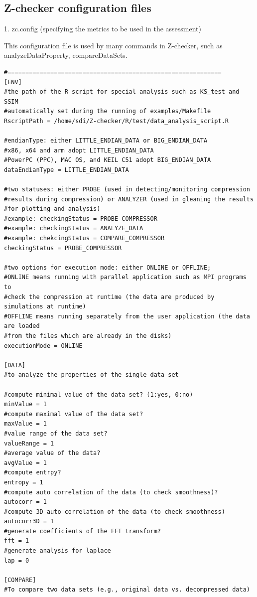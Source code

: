 \subsection{Z-checker configuration files}

1. zc.config (specifying the metrics to be used in the assessment)

This configuration file is used by many commands in Z-checker, such as analyzeDataProperty, compareDataSets.
\begin{lstlisting}[style=ShellStyleInline, basicstyle =\footnotesize\ttfamily]
#============================================================
[ENV]
#the path of the R script for special analysis such as KS_test and SSIM
#automatically set during the running of examples/Makefile
RscriptPath = /home/sdi/Z-checker/R/test/data_analysis_script.R

#endianType: either LITTLE_ENDIAN_DATA or BIG_ENDIAN_DATA
#x86, x64 and arm adopt LITTLE_ENDIAN_DATA
#PowerPC (PPC), MAC OS, and KEIL C51 adopt BIG_ENDIAN_DATA
dataEndianType = LITTLE_ENDIAN_DATA

#two statuses: either PROBE (used in detecting/monitoring compression
#results during compression) or ANALYZER (used in gleaning the results
#for plotting and analysis)
#example: checkingStatus = PROBE_COMPRESSOR
#example: checkingStatus = ANALYZE_DATA
#example: chekcingStatus = COMPARE_COMPRESSOR
checkingStatus = PROBE_COMPRESSOR

#two options for execution mode: either ONLINE or OFFLINE;
#ONLINE means running with parallel application such as MPI programs to
#check the compression at runtime (the data are produced by simulations at runtime)
#OFFLINE means running separately from the user application (the data are loaded
#from the files which are already in the disks)
executionMode = ONLINE

[DATA]
#to analyze the properties of the single data set

#compute minimal value of the data set? (1:yes, 0:no)
minValue = 1
#compute maximal value of the data set?
maxValue = 1
#value range of the data set?
valueRange = 1
#average value of the data?
avgValue = 1
#compute entrpy?
entropy = 1
#compute auto correlation of the data (to check smoothness)?
autocorr = 1
#compute 3D auto correlation of the data (to check smoothness)
autocorr3D = 1
#generate coefficients of the FFT transform?
fft = 1
#generate analysis for laplace
lap = 0

[COMPARE]
#To compare two data sets (e.g., original data vs. decompressed data)


\end{lstlisting}
